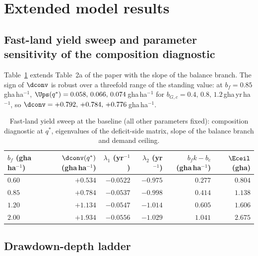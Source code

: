\section{Extended model results}\label{si:results}

\subsection{Fast-land yield sweep and parameter sensitivity of the composition diagnostic}\label{si:sweep}

Table~\ref{tab:si_sweep} extends Table~2a of the paper with the slope of the balance branch. The sign of $\dconv$ is robust over a threefold range of the standing value: at $b_f=0.85$\,gha\,ha$^{-1}$, $\Ups(q^*)=0.058,\,0.066,\,0.074$\,gha\,ha$^{-1}$ for $b_{G,c}=0.4,\,0.8,\,1.2$\,gha\,yr\,ha$^{-1}$, so $\dconv=+0.792,\,+0.784,\,+0.776$\,gha\,ha$^{-1}$.

\begin{table}[htbp]
\centering\small
\caption{Fast-land yield sweep at the baseline (all other parameters fixed): composition diagnostic at $q^*$, eigenvalues of the deficit-side matrix, slope of the balance branch and demand ceiling.}
\label{tab:si_sweep}
\begin{tabular}{l r r r r r}
\toprule
$b_f$ (gha\,ha$^{-1}$) & $\dconv(q^*)$ (gha\,ha$^{-1}$) & $\lambda_1$ (yr$^{-1}$) & $\lambda_2$ (yr$^{-1}$) & $b_fk-b_c$ (gha\,ha$^{-1}$) & $\Eceil$ (gha) \\
\midrule
$0.60$ & $+0.534$ & $-0.0522$ & $-0.975$ & $0.277$ & $0.804$ \\
$0.85$ & $+0.784$ & $-0.0537$ & $-0.998$ & $0.414$ & $1.138$ \\
$1.20$ & $+1.134$ & $-0.0547$ & $-1.014$ & $0.605$ & $1.606$ \\
$2.00$ & $+1.934$ & $-0.0556$ & $-1.029$ & $1.041$ & $2.675$ \\
\bottomrule
\end{tabular}
\end{table}

\subsection{Drawdown-depth ladder}\label{si:ladder}

